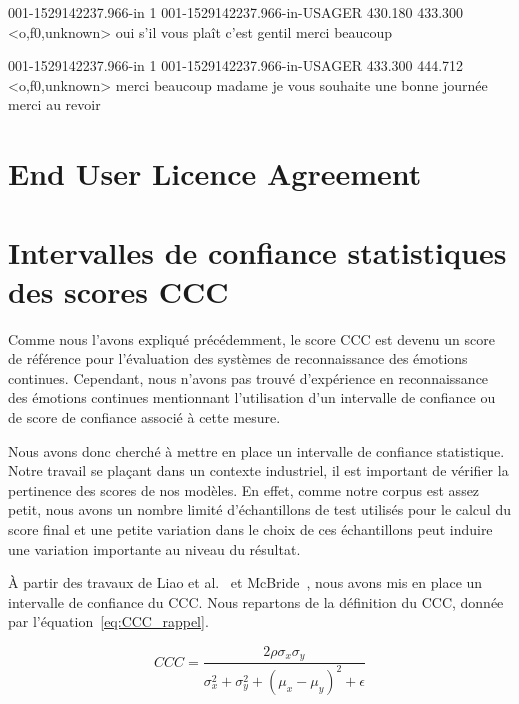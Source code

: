 001-1529142237.966-in 1 001-1529142237.966-in-USAGER 430.180 433.300 <o,f0,unknown> oui s'il vous plaît c'est gentil merci beaucoup

001-1529142237.966-in 1 001-1529142237.966-in-USAGER 433.300 444.712 <o,f0,unknown> merci beaucoup madame je vous souhaite une bonne journée merci au revoir

\section{End User Licence Agreement}
\label{ap:eula}
%


\section{Intervalles de confiance statistiques des scores CCC}
Comme nous l'avons expliqué précédemment, le score CCC est devenu un score de référence pour l'évaluation des systèmes de reconnaissance des émotions continues. %
Cependant, nous n'avons pas trouvé d'expérience en reconnaissance des émotions continues  mentionnant l'utilisation d'un intervalle de confiance ou de score de confiance associé à cette mesure.

Nous avons donc cherché à mettre en place un intervalle de confiance statistique. Notre travail se plaçant dans un contexte industriel, il est important de vérifier la pertinence des scores de nos modèles. En effet, comme notre corpus est assez petit, nous avons un nombre limité d'échantillons de test utilisés pour le calcul du score final et une petite variation dans le choix de ces échantillons peut induire une variation importante au niveau du résultat.

À partir des travaux de Liao et al.~\cite{Liao2000} et McBride~\cite{McBride2005}, nous avons mis en place un intervalle de confiance du CCC. Nous repartons de la définition du CCC, donnée par l'équation~\ref{eq:CCC_rappel}.

\begin{equation}
   CCC = \frac{2\rho\sigma_x\sigma_y}{\sigma_x^2 + \sigma_y^2 + (\mu_x - \mu_y)^2 + \epsilon}
\label{eq:CCC_rappel}
\end{equation}

